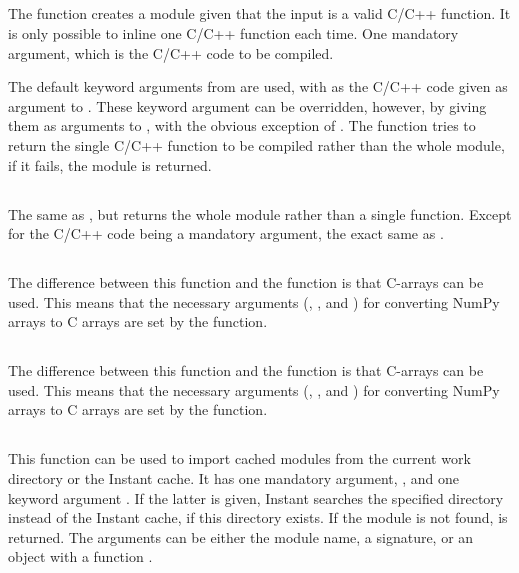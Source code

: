 \subsection[inline]{}
The function  creates a module given that the input is a valid C/C++ function. It is only
possible to inline one C/C++ function each time. One mandatory argument, which
is the C/C++ code to be compiled.

The default keyword arguments from  are used, with
 as the C/C++ code given as argument to . These keyword
argument can be overridden, however, by giving them as arguments to
, with the obvious exception of . The function tries to
return the single C/C++ function to be compiled rather than the whole module, if
it fails, the module is returned.


\subsection[inline\_module]{}
The same as , but returns the whole module rather than a single
function. Except for the C/C++ code being a mandatory argument, the exact same as
.


\subsection[inline\_with\_numpy]{}
The difference between this function and the  function is that
C-arrays can be used. This means that the necessary arguments
(, , and ) for converting
NumPy arrays to C arrays are set by the function.


\subsection[inline\_module\_with\_numpy]{}
The difference between this function and the  function is
that C-arrays can be used.  This means that the necessary arguments
(, , and ) for converting
NumPy arrays to C arrays are set by the function.


\subsection[import\_module]{}
This function can be used to import cached modules from the current work
directory or the Instant cache. It has one mandatory argument,
, and one keyword argument . If the latter is
given, Instant searches the specified directory instead of the Instant cache,
if this directory exists. If the module is
not found,  is returned. The 
arguments can be either the module name, a signature, or an object
with a function .

